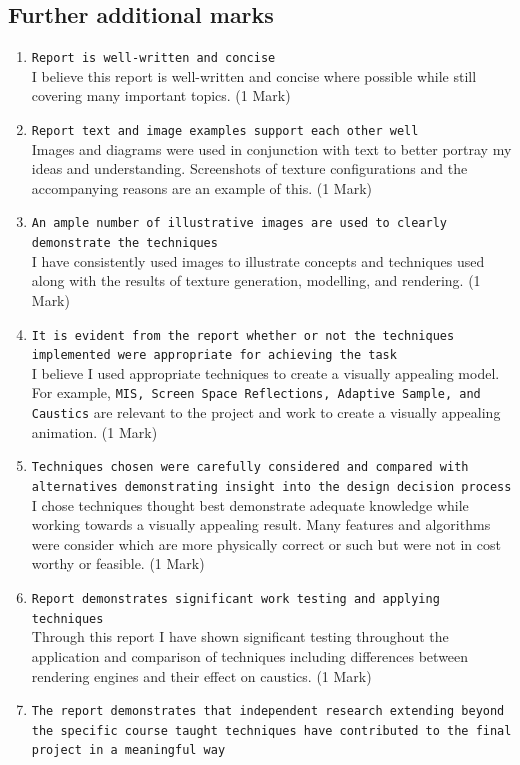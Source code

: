 \documentclass[11pt]{article}
\begin{document}
\subsection{Further additional marks}
\label{sec:orgf699856}
\begin{enumerate}
\item \texttt{Report is well-written and concise}\\
I believe this report is well-written and concise where possible while still covering many
important topics. (1 Mark)
\item \texttt{Report text and image examples support each other well}\\
Images and diagrams were used in conjunction with text to better portray my
ideas and understanding. Screenshots of texture configurations and the
accompanying reasons are an example of this. (1 Mark)
\item \texttt{An ample number of illustrative images are used to clearly demonstrate the
    techniques}\\
I have consistently used images to illustrate concepts and techniques used
along with the results of texture generation, modelling, and rendering. (1 Mark)
\item \texttt{It is evident from the report whether or not the techniques implemented
    were appropriate for achieving the task}\\
I believe I used appropriate techniques to create a visually appealing
model. For example, \texttt{MIS, Screen Space Reflections, Adaptive Sample,
    and Caustics} are relevant to the project and work to create a visually
appealing animation. (1 Mark)
\item \texttt{Techniques chosen were carefully considered and compared with alternatives
    demonstrating insight into the design decision process}\\
I chose techniques thought best demonstrate adequate knowledge while
working towards a visually appealing  result. Many features and algorithms
were consider which are more physically correct or such but were not in cost
worthy or feasible. (1 Mark)
\item \texttt{Report demonstrates significant work testing and applying techniques}\\
Through this report I have shown significant testing throughout the
application and comparison of techniques including differences between
rendering engines and their effect on caustics. (1 Mark)
\item \texttt{The report demonstrates that independent research extending beyond the specific course taught techniques have contributed to the final project in a meaningful way}\\

\end{enumerate}
\end{document}
